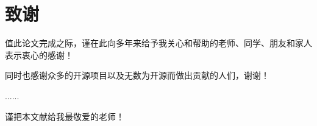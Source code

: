 
\chapter*{致\quad 谢}

值此论文完成之际，谨在此向多年来给予我关心和帮助的老师、同学、朋友和家人表示衷心的感谢！


同时也感谢众多的开源项目以及无数为开源而做出贡献的人们，谢谢！

......

\vspace{18pt}

谨把本文献给我最敬爱的老师！